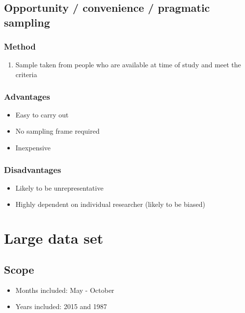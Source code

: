 \subsection{Opportunity / convenience / pragmatic sampling}
\subsubsection{Method}
\begin{enumerate}
	\item Sample taken from people who are available at time of study and meet the criteria
\end{enumerate}
\subsubsection{Advantages}
\begin{itemize}
	\item Easy to carry out
	\item No sampling frame required
	\item Inexpensive
\end{itemize}
\subsubsection{Disadvantages}
\begin{itemize}
	\item Likely to be unrepresentative
	\item Highly dependent on individual researcher (likely to be biased)
\end{itemize}

\section{Large data set}
\subsection{Scope}
\begin{itemize}
	\item Months included: May - October
	\item Years included: 2015 and 1987
\end{itemize}
